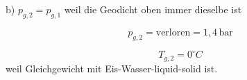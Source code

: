 b) \( p_{g,2} = p_{g,1} \) weil die Geodicht oben immer dieselbe ist

\[ p_{g,2} = \text{verloren} = 1,4 \, \text{bar} \]

\[ T_{g,2} = 0^\circ C \] weil Gleichgewicht mit Eis-Wasser-liquid-solid ist.